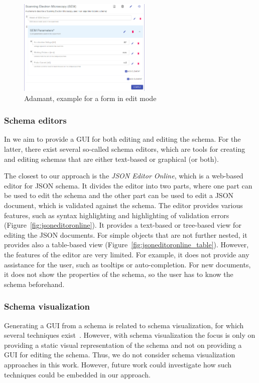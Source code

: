 \begin{figure}[htb]
    \centering
    \includegraphics[width=2.5in]{figures/adamant}
    \caption{Adamant, example for a form in edit mode}
    \label{fig:adamant}
\end{figure}


\subsubsection{Schema editors}\label{subsubsec:schema-editors}
In \toolname{} we aim to provide a GUI for both editing \cfgfiles{} and editing the schema.
For the latter, there exist several so-called schema editors, which are tools for creating and editing schemas that are
either text-based or graphical (or both).

The closest to our approach is the \textit{JSON Editor Online}\cite{jsoneditoronlineJSONEditor}, which is a web-based editor for JSON schema.
It divides the editor into two parts, where one part can be used to edit the schema and the other part can be used to edit a JSON document,
which is validated against the schema.
The editor provides various features, such as syntax highlighting and highlighting of validation errors (Figure~\ref{fig:jsoneditoronline}).
It provides a text-based or tree-based view for editing the JSON documents.
For simple objects that are not further nested, it provides also a table-based view (Figure~\ref{fig:jsoneditoronline_table}).
However, the features of the editor are very limited.
For example, it does not provide any assistance for the user, such as tooltips or auto-completion.
For new documents, it does not show the properties of the schema, so the user has to know the schema beforehand.

\subsubsection{Schema visualization}\label{subsubsec:schema-visualization}
Generating a GUI from a schema is related to schema visualization, for which several techniques exist~\cite{Frasincar2006, SILVA201928, 10.1145/1317353.1317362, 1173142}.
However, with schema visualization the focus is only on providing a static visual representation of the schema
and not on providing a GUI for editing the schema.
Thus, we do not consider schema visualization approaches in this work.
However, future work could investigate how such techniques could be embedded in our approach.

